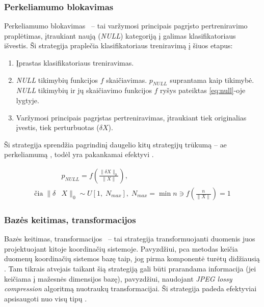 \def\strat{Perkeliamumo blokavimas}
\subsubsection{\strat}\label{sec:literature:defense:blocking}

\strat~ -- tai varžymosi principais pagrįsto pertreniravimo  praplėtimas, įtraukiant naują (\textit{NULL}) kategoriją į galimas klasifikatoriaus išvestis. Ši strategija praplečia klasifikatoriaus treniravimą į šiuos etapus:
\begin{enumerate}
    \item Įprastas klasifikatoriaus treniravimas.
    \item \textit{NULL} tikimybių funkcijos $f$ skaičiavimas. $p_{NULL}$ suprantama kaip  tikimybė. \textit{NULL} tikimybių ir jų skaičiavimo funkcijos $f$ ryšys pateiktas \ref{eq:null}-oje lygtyje.
    \item Varžymosi principais pagrįstas pertreniravimas, įtraukiant tiek originalias įvestis, tiek perturbuotas ($\delta X$).
\end{enumerate}

Ši strategija sprendžia pagrindinį daugelio kitų strategijų trūkumą -- \gls{ae} perkeliamumą , todėl yra pakankamai efektyvi \cite{chakrabortySurveyAdversarialAttacks2021}.

\begin{equation}\label{eq:null}
    \begin{split}
        &p_{NULL} = f\left(\frac{\| \delta X \|_0}{\|X\|}\right),\\
        \text{čia}\; \| \delta
        &X \|_0 \sim U[1,\; N_{max}], \; N_{max} = \min n \ni f\left(\frac{n}{\|X\|}\right)
        = 1
    \end{split}
\end{equation}



\def\strat{Bazės keitimas, transformacijos}
\subsubsection{\strat}\label{sec:literature:defense:basis}

\strat~ -- tai strategija transformuojanti duomenis juos projektuojant kitoje koordinačių sistemoje. Pavyzdžiui, \gls{pca} metodas keičia duomenų koordinačių sistemos bazę taip, jog pirma komponentė turėtų didžiausią . Tam tikrais atvejais taikant šią strategiją gali būti prarandama informacija (jei keičiama į mažesnės dimensijos bazę), pavyzdžiui, naudojant \textit{JPEG lossy compression} algoritmą nuotraukų transformacijai. Ši strategija padeda efektyviai apsisaugoti nuo visų tipų  \cite{chakrabortySurveyAdversarialAttacks2021}.